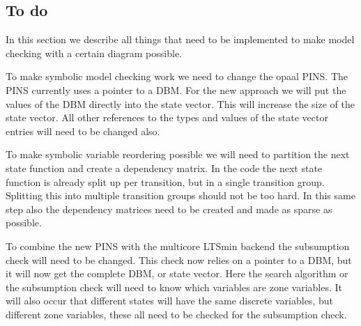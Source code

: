 \documentclass[11pt]{article}
\begin{document}


\subsection{To do}
In this section we describe all things that need to be implemented to make model checking with a certain diagram possible. 

To make symbolic model checking work we need to change the opaal PINS. The PINS currently uses a pointer to a DBM. For the new approach we will put the values of the DBM directly into the state vector. This will increase the size of the state vector. All other references to the types and values of the state vector entries will need to be changed also. 

To make symbolic variable reordering possible we will need to partition the next state function and create a dependency matrix. In the code the next state function is already split up per transition, but in a single transition group. Splitting this into multiple transition groups should not be too hard. In this same step also the dependency matrices need to be created and made as sparse as possible.

To combine the new PINS with the multicore LTSmin backend the subsumption check will need to be changed. This check now relies on a pointer to a DBM, but it will now get the complete DBM, or state vector. Here the search algorithm or the subsumption check will need to know which variables are zone variables. It will also occur that different states will have the same discrete variables, but different zone variables, these all need to be checked for the subsumption check.
\end{document}

